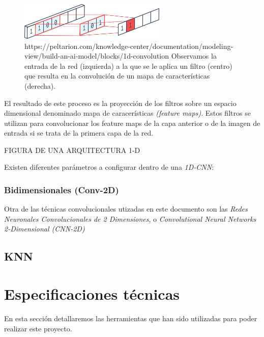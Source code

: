                 \begin{figure}[h]
                    \centering
                    \includegraphics[width=7cm]{archivos/CNN/1D/1DConvolution}
                    \caption{https://peltarion.com/knowledge-center/documentation/modeling-view/build-an-ai-model/blocks/1d-convolution Observamos la entrada de la red (izquierda) a la que se le aplica un filtro (centro) que resulta en la convolución de un mapa de características (derecha).}
                    \label{1DConvolutionImage}
                \end{figure}

                El resultado de este proceso es la proyección de los filtros sobre un espacio dimensional denominado mapa de caracerísticas \textit{(feature maps)}. Estos filtros se utilizan para convolucionar los feature maps de la capa anterior \cite{FiltersFeatureMaps} o de la imagen de entrada si se trata de la primera capa de la red.

                FIGURA DE UNA ARQUITECTURA 1-D

                Existen diferentes parámetros a configurar dentro de una \textit{1D-CNN}:






                \cite{Conv1D_Survey}
            \subsubsection {Bidimensionales (Conv-2D)}
                Otra de las técnicas convolucionales utizadas en este documento son las \textit{Redes Neuronales Convolucionales de 2 Dimensiones}, o \textit{Convolutional Neural Networks 2-Dimensional (CNN-2D)}

        \subsection {KNN}

    \section{Especificaciones técnicas}

        En esta sección detallaremos las herramientas que han sido utilizadas para poder realizar este proyecto.


